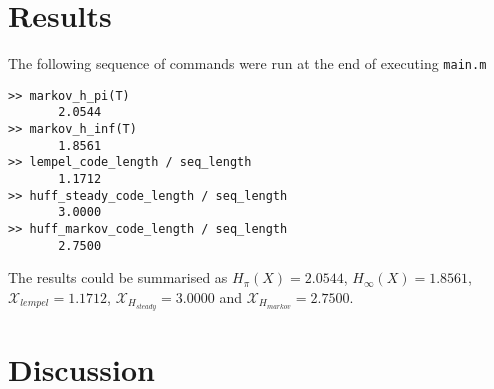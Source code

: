 \documentclass[a4paper,10pt]{article}
\begin{document}
\pagebreak
\section*{Results}
The following sequence of commands were run at the end of executing \texttt{main.m}
\begin{verbatim}
>> markov_h_pi(T)
       2.0544
>> markov_h_inf(T)
       1.8561
>> lempel_code_length / seq_length
       1.1712
>> huff_steady_code_length / seq_length
       3.0000
>> huff_markov_code_length / seq_length
       2.7500
\end{verbatim}
The results could be summarised as $H_{\pi}(X) = 2.0544$, $H_{\infty}(X) = 1.8561$, $\mathcal{X}_{lempel} = 1.1712$, $\mathcal{X}_{H_{steady}} = 3.0000$ and $\mathcal{X}_{H_{markov}} = 2.7500$.


\section*{Discussion}
\end{document}
